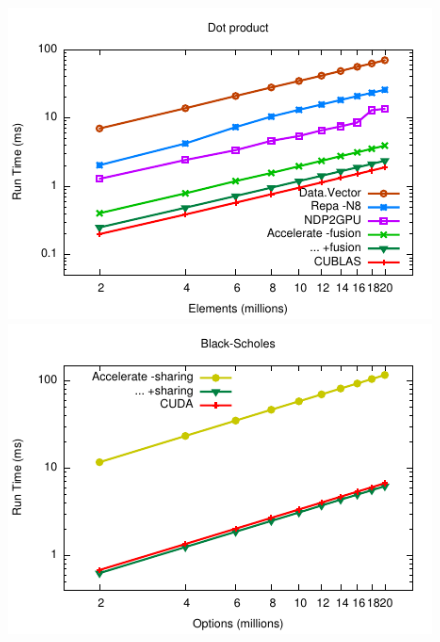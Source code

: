\begin{figure}
\hspace{-1em}
\includegraphics[scale=1.2]{benchmarks/figs/dotp/dotp.pdf}
\includegraphics[scale=1.2]{benchmarks/figs/black-scholes/black-scholes.pdf}


\end{figure}
